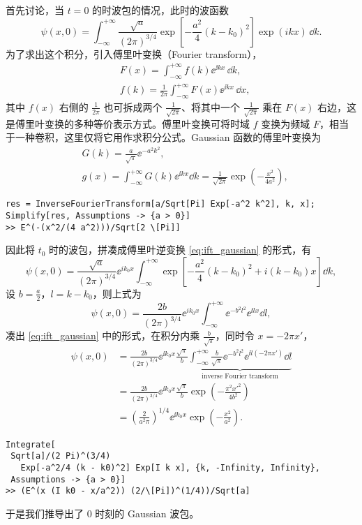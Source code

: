 首先讨论，当 $t = 0$ 的时波包的情况，此时的波函数
\begin{equation}\label{eq:wp_t0}
\psi(x, 0) = \int_{-\infty} ^{+\infty} \frac{\sqrt{a}}{(2 \pi)^{3/4}} \exp \left[ - \frac{a^2}{4} (k - k_0)^2 \right] \exp \left( i  k x  \right) \, \dd k. 
\end{equation}
为了求出这个积分，引入傅里叶变换（Fourier transform），
\begin{align}
    &F(x) = \int_{-\infty} ^{+\infty} f(k) \ee^{\ii kx}\,\dd k, \\
    &f(k) = \frac1{2\pi}\int_{-\infty} ^{+\infty} F(x) \ee^{\ii kx}\, \dd x, 
\end{align}
其中 $f(x)$ 右侧的 $\frac{1}{2\pi}$ 也可拆成两个 $\frac1{\sqrt{2\pi}}$、将其中一个 $\frac1{\sqrt{2\pi}}$ 乘在 $F(x)$ 右边，这是傅里叶变换的多种等价表示方式。傅里叶变换可将时域 $f$ 变换为频域 $F$，相当于一种卷积，这里仅将它用作求积分公式。Gaussian 函数的傅里叶变换为
\begin{align}
    &G(k) = \frac a{\sqrt \pi} \ee^{-a^2 k^2}, \\
    &g(x) = %
    \int_{-\infty} ^{+\infty} G(k) \ee^{\ii kx} \dd k =  \frac{1}{\sqrt{2\pi}} \exp\left(-\frac{x^2}{4a^2}\right), \label{eq:ift_gaussian}
\end{align}
\begin{lstlisting}
res = InverseFourierTransform[a/Sqrt[Pi] Exp[-a^2 k^2], k, x];
Simplify[res, Assumptions -> {a > 0}]
>> E^(-(x^2/(4 a^2)))/Sqrt[2 \[Pi]]
\end{lstlisting}
因此将 $t_0$ 时的波包，拼凑成傅里叶逆变换 \eqref{eq:ift_gaussian} 的形式，有
\begin{equation}
    \psi(x, 0) = \frac{\sqrt{a}}{(2 \pi)^{3/4}}  \ee^{i  k_0 x} \int_{-\infty} ^{+\infty} \exp \left[ - \frac{a^2}{4} (k - k_0)^2 + i(k-k_0)x  \right] \dd k,
\end{equation}
设 $b = \frac a2$，$l = k-k_0$，则上式为
\begin{equation}
    \psi(x, 0) = \frac{2b}{(2 \pi)^{3/4}} \ee^{i  k_0 x} \int_{-\infty} ^{+\infty} 
    \ee^{-b^2l^2} \ee^{\ii l x} \dd l, 
\end{equation}
凑出 \eqref{eq:ift_gaussian} 中的形式，在积分内乘 $\frac b{\sqrt{\pi}}$，同时令 $x = - 2\pi x'$，
\begin{align}
    \psi(x,0) &= \frac{2b}{(2 \pi)^{3/4}} \ee^{\ii k_0 x} \frac{\sqrt{\pi}}b \underbrace{\int_{-\infty} ^{+\infty} \frac b{\sqrt{\pi}} \ee^{-b^2l^2} \ee^{\ii l (-2\pi x')} \dd l}_{\text{inverse Fourier transform}} \\
    &= \frac{2b}{(2 \pi)^{3/4}} \ee^{\ii k_0 x} \frac{\sqrt{\pi}}b  \exp\left(-\frac{\pi^2x'^2}{4 b^2}\right) \\
    &= \left(\frac{2}{a^2\pi}\right)^{1/4} \ee^{\ii k_0 x} \exp\left(-\frac{x^2}{a^2}\right). \label{eq:wp_photon_t0}
\end{align}
\begin{lstlisting}
Integrate[
 Sqrt[a]/(2 Pi)^(3/4)
   Exp[-a^2/4 (k - k0)^2] Exp[I k x], {k, -Infinity, Infinity}, 
 Assumptions -> {a > 0}]
>> (E^(x (I k0 - x/a^2)) (2/\[Pi])^(1/4))/Sqrt[a]
\end{lstlisting}
于是我们推导出了 0 时刻的 Gaussian 波包。%

